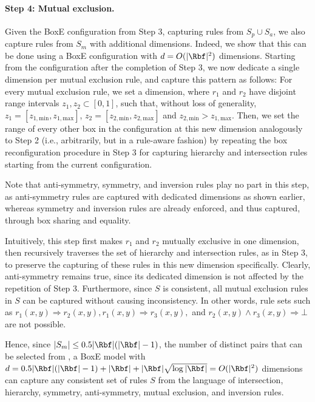\documentclass{article}
\begin{document}
\paragraph{Step 4: Mutual exclusion.} 

Given the BoxE configuration from Step 3, capturing rules from $S_{p} \cup S_{a}$, we also capture rules from $S_m$ with additional dimensions. Indeed, we show that this can be done using a BoxE configuration with $d = O(|\Rbf|^2)$ dimensions. Starting from the configuration after the completion of Step 3, we now dedicate a single dimension per mutual exclusion rule, and capture this pattern as follows: For every mutual exclusion rule, we set a dimension, where $r_1$ and $r_2$ have disjoint range intervals $z_1, z_2 \subset [0,1]$, such that, without loss of generality, $z_1 = [z_{1,\text{min}}, z_{1,\text{max}}]$, $z_2 = [z_{2,\text{min}}, z_{2,\text{max}}]$ and $z_{2,\text{min}} > z_{1,\text{max}}$.  Then, we set the range of every other box in the configuration at this new dimension analogously to Step 2 (i.e., arbitrarily, but in a rule-aware fashion) by repeating the box reconfiguration procedure in Step 3 for capturing hierarchy and intersection rules starting from the current configuration. 

Note that anti-symmetry, symmetry, and inversion rules play no part in this step, as anti-symmetry rules are captured with dedicated dimensions as shown earlier, whereas symmetry and inversion rules are already enforced, and thus captured, through box sharing and equality.

Intuitively, this step first makes $r_1$ and $r_2$ mutually exclusive in one dimension, then recursively traverses the set of hierarchy and intersection rules, as in Step 3, to preserve the capturing of these rules in this new dimension specifically. Clearly, anti-symmetry remains true, since its dedicated dimension is not affected by the repetition of Step 3. Furthermore, since $S$ is consistent, all mutual exclusion rules in $S$ can be captured without causing inconsistency. In other words, rule sets such as $r_1(x,y) \Rightarrow r_2(x,y), r_1(x,y) \Rightarrow r_3(x,y), $ and $r_2(x,y) \land  r_3(x,y) \Rightarrow \bot$ are not possible. 

Hence, since $|S_m| \leq 0.5|\Rbf|(|\Rbf| -1)$, the number of distinct pairs that can be selected from \Rbf, a BoxE model with $d = 0.5|\Rbf|(|\Rbf| -1) + |\Rbf| + |\Rbf|\sqrt{\log{|\Rbf|}} = O(|\Rbf|^2)$ dimensions can capture any consistent set of rules $S$ from the language of intersection, hierarchy, symmetry, anti-symmetry, mutual exclusion, and inversion rules.   
\end{document}
